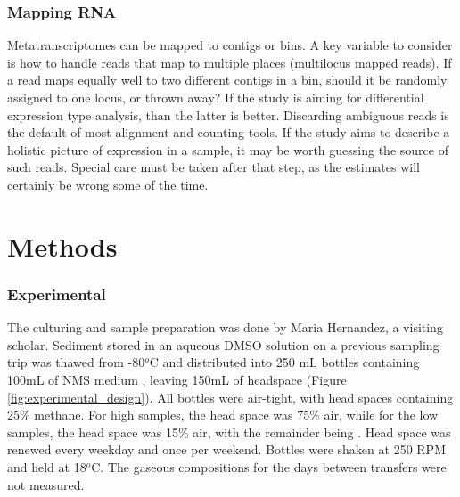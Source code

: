 \subsubsection{Mapping RNA}
Metatranscriptomes can be mapped to contigs or bins.
A key variable to consider is how to handle reads that map to multiple places (multilocus mapped reads).
If a read maps equally well to two different contigs in a bin, should it be randomly assigned to one locus, or thrown away?
If the study is aiming for differential expression type analysis, than the latter is better.
Discarding ambiguous reads is the default of most alignment and counting tools.
If the study aims to describe a holistic picture of expression in a sample, it may be worth guessing the source of such reads.
Special care must be taken after that step, as the estimates will certainly be wrong some of the time.


\section{Methods}

\subsubsection{Experimental}  %
The culturing and sample preparation was done by Maria Hernandez, a visiting scholar.
Sediment stored in an aqueous DMSO solution on a previous sampling trip was thawed from -80$^o$C and distributed into 250 mL bottles containing 100mL of NMS medium \cite{whittenbury1970, dedysh2014}, leaving 150mL of headspace (Figure \ref{fig:experimental_design}).
All bottles were air-tight, with head spaces containing 25\% methane.
For high  samples, the head space was 75\% air, while for the low  samples, the head space was 15\% air, with the remainder being .
Head space was renewed every weekday and once per weekend.
Bottles were shaken at 250 RPM and held at 18$^o$C.
The gaseous compositions for the days between transfers were not measured.

